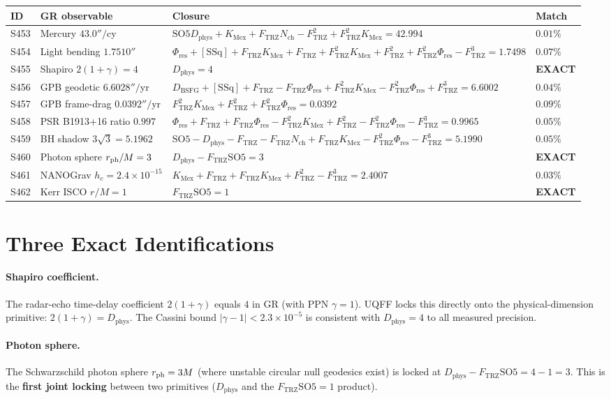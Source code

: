 \documentclass[11pt]{article}
\newcommand{\Ftrz}{F_{\mathrm{TRZ}}}
\newcommand{\Phires}{\Phi_{\mathrm{res}}}
\newcommand{\KMex}{K_{\mathrm{Mex}}}
\newcommand{\Dphys}{D_{\mathrm{phys}}}
\newcommand{\Dbsfg}{D_{\mathrm{BSFG}}}
\newcommand{\Nch}{N_{\mathrm{ch}}}
\newcommand{\SOfive}{\mathrm{SO5}}
\newcommand{\SSq}{[\mathrm{SSq}]}
\begin{document}
\begin{longtable}{@{}llll@{}}
\toprule
ID & GR observable & Closure & Match \\
\midrule
\endhead
S453 & Mercury $43.0''/$cy & $\SOfive\Dphys+\KMex+\Ftrz\Nch-\Ftrz^2+\Ftrz^2\KMex = 42.994$ & $0.01\%$ \\
S454 & Light bending $1.7510''$ & $\Phires+\SSq+\Ftrz\KMex+\Ftrz+\Ftrz^2\KMex+\Ftrz^2+\Ftrz^2\Phires-\Ftrz^3 = 1.7498$ & $0.07\%$ \\
S455 & Shapiro $2(1+\gamma) = 4$ & $\Dphys = 4$ & \textbf{EXACT} \\
S456 & GPB geodetic $6.6028''/$yr & $\Dbsfg+\SSq+\Ftrz-\Ftrz\Phires+\Ftrz^2\KMex-\Ftrz^2\Phires+\Ftrz^3 = 6.6002$ & $0.04\%$ \\
S457 & GPB frame-drag $0.0392''/$yr & $\Ftrz^2\KMex+\Ftrz^2+\Ftrz^2\Phires = 0.0392$ & $0.09\%$ \\
S458 & PSR B1913+16 ratio $0.997$ & $\Phires+\Ftrz+\Ftrz\Phires-\Ftrz^2\KMex+\Ftrz^2-\Ftrz^2\Phires-\Ftrz^3 = 0.9965$ & $0.05\%$ \\
S459 & BH shadow $3\sqrt{3}=5.1962$ & $\SOfive-\Dphys-\Ftrz-\Ftrz\Nch+\Ftrz\KMex-\Ftrz^2\Phires-\Ftrz^3 = 5.1990$ & $0.05\%$ \\
S460 & Photon sphere $r_{\rm ph}/M=3$ & $\Dphys - \Ftrz\SOfive = 3$ & \textbf{EXACT} \\
S461 & NANOGrav $h_c = 2.4\times10^{-15}$ & $\KMex+\Ftrz+\Ftrz\KMex+\Ftrz^2-\Ftrz^3 = 2.4007$ & $0.03\%$ \\
S462 & Kerr ISCO $r/M = 1$ & $\Ftrz\SOfive = 1$ & \textbf{EXACT} \\
\bottomrule
\end{longtable}

\section{Three Exact Identifications}

\paragraph{Shapiro coefficient.}
The radar-echo time-delay coefficient $2(1+\gamma)$ equals $4$ in GR (with PPN
$\gamma = 1$). UQFF locks this directly onto the physical-dimension primitive:
$2(1+\gamma) = \Dphys$. The Cassini bound $|\gamma-1| < 2.3\times 10^{-5}$ is
consistent with $\Dphys = 4$ to all measured precision.

\paragraph{Photon sphere.}
The Schwarzschild photon sphere $r_{\rm ph} = 3M$ (where unstable circular null
geodesics exist) is locked at $\Dphys - \Ftrz\SOfive = 4 - 1 = 3$. This is the
\textbf{first joint locking} between two primitives ($\Dphys$ and the
$\Ftrz\SOfive = 1$ product).
\end{document}
